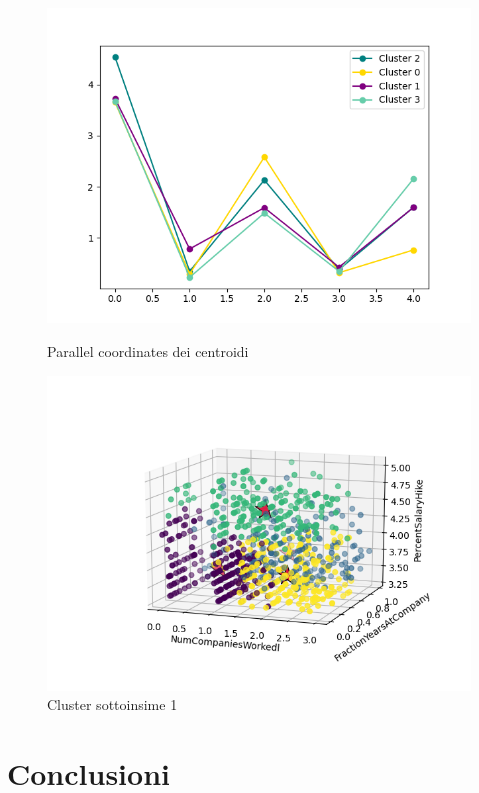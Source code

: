 \documentclass[english]{article}
\begin{document}
\begin{figure}[H]
\begin{minipage}[b]{0.47\textwidth}
\centering
\includegraphics[width=\textwidth]{parallelsub1.png}
\caption{Parallel coordinates dei centroidi}
\label{etichetta1}
\end{minipage}
\hfill
\begin{minipage}[b]{0.55\textwidth}
\includegraphics[scale=0.6]{numcompan_Fraction_percentCENTROIDI.png}
\caption{Cluster sottoinsime 1 }
\label{etichetta2}
\end{minipage}
\end{figure}




\section{Conclusioni}
\end{document}
